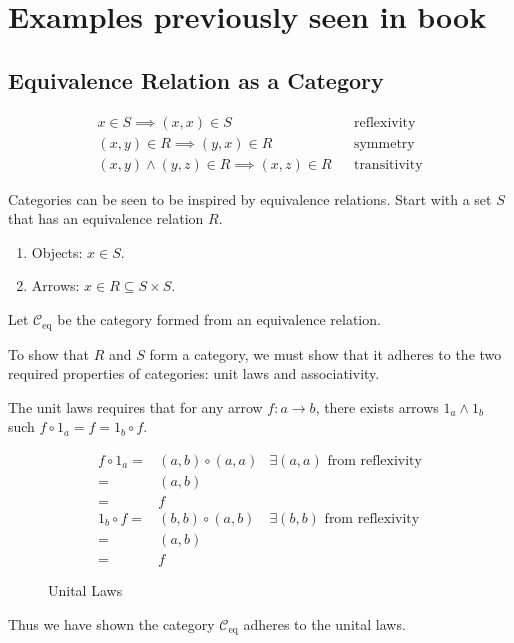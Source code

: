 \section{Examples previously seen in book}
\subsection{Equivalence Relation as a Category}
\begin{proofitem}
    \item
\begin{align}
    x \in S \implies (x, x) \in S &&\text{reflexivity}\\
    (x,y) \in R \implies (y, x) \in R &&\text{symmetry}\\
    (x,y) \land (y, z) \in R \implies (x, z) \in R &&\text{transitivity}
\end{align}
\item
Categories can be seen to be inspired by equivalence relations. Start with a set
$S$ that has an equivalence relation $R$.
\begin{enumerate}
    \item Objects: $x\in S$.
    \item Arrows: $x\in R\subseteq S\times S$.
\end{enumerate}
\item Let $\mathcal{C}_{\text{eq}}$ be the category formed from an equivalence
    relation.
\item To show that $R$ and $S$ form a category, we must show that it adheres to
    the two required properties of categories: unit laws and associativity.
\item The unit laws requires that for any arrow $f:a \rightarrow b$, there
    exists arrows $1_a \land 1_b$ such $f\circ 1_a = f = 1_b \circ f$.
\begin{figure}[H]
\begin{align*}
    f\circ 1_a=& (a, b)\circ (a, a)&\exists(a,a)\text{ from reflexivity}\\
    =&(a, b)\\
    =&f\\
    1_b\circ f=& (b, b)\circ (a, b) &\exists(b,b)\text{ from reflexivity}\\
    =&(a, b)\\
    =&f
\end{align*}
\caption{Unital Laws}
\end{figure}
\item Thus we have shown the category $\mathcal{C}_{\text{eq}}$ adheres to the unital laws.

\end{proofitem}
